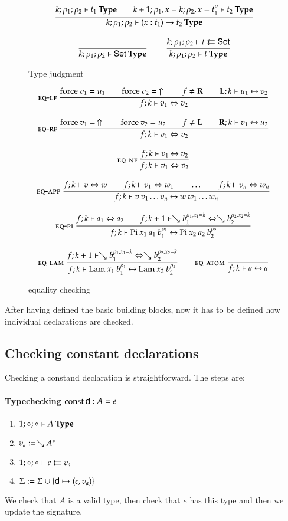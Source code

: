\begin{figure}[p]
\begin{gather*}
\nru{}
{\IsType{k}{\rho_1}{\rho_2}{t_1}
\qquad
\IsType{k+1}{\ins{\rho_1}{x}{k}}{\ins{\rho_2}{x}{\cl{t_1}{\rho}}}{t_2}}
{\IsType{k}{\rho_1}{\rho_2}{\EPi{x}{t_1}{t_2}}}
\\[2ex]
\nru{}{}{\IsType{k}{\rho_1}{\rho_2}{\Set}}
\qquad
\nru{}
{\Check{k}{\rho_1}{\rho_2}{t}{\Set}}
{\IsType{k}{\rho_1}{\rho_2}{t}}
\end{gather*}
\caption{Type judgment}
\end{figure}

\begin{figure}[p]
\begin{gather*}
\nru{\eqlf}
{\forc \: v_1 = u_1 \qquad \forc \: v_2 = \stuck 
\qquad
f \neq \rF \qquad \FeqVal{\lF}{k}{u_1}{v_2}}
{ \EqVal{f}{k}{v_1}{v_2}}
\\[2ex]
\nru{\eqrf}
{\forc \: v_1 = \stuck \qquad \forc \: v_2 = u_2 
\qquad
f \neq \lF \qquad \FeqVal{\rF}{k}{v_1}{u_2}}
{ \EqVal{f}{k}{v_1}{v_2}}
\\[2ex]
\nru{\eqnf}
{\FeqVal{f}{k}{v_1}{v_2}}
{ \EqVal{f}{k}{v_1}{v_2}}
\\[2ex]
\nru{\eqapp}
{\EqVal{f}{k}{v}{w} \qquad
\EqVal{f}{k}{v_1}{w_1} \qquad \ldots \qquad \EqVal{f}{k}{v_n}{w_n}}
{\FeqVal{f}{k}{v \: v_1 \ldots v_n}{w \: w_1 \ldots w_n}}
\\[2ex]
\nru{\eqpi}
{\EqVal{f}{k}{a_1}{a_2}
\qquad
\EqVal{f}{k+1}{\wh \cl{b_1}{\ins{\rho_1}{x_1}{k}}}{\wh \cl{b_2}{\ins{\rho_2}{x_2}{k}}}}
{\FeqVal{f}{k}{\vpi \: x_1 \: a_1 \: \cl{b_1}{\rho_1}}{\vpi \: x_2 \: a_2 \: \cl{b_2}{\rho_2}}}
\\[2ex]
\nru{\eqlam}
{\EqVal{f}{k+1}{\wh \cl{b_1}{\ins{\rho_1}{x_1}{k}}}{\wh \cl{b_2}{\ins{\rho_2}{x_2}{k}}}}
{\FeqVal{f}{k}{\vlam \: x_1 \: \cl{b_1}{\rho_1}}{\vlam \: x_2 \: \cl{b_2}{\rho_2}}}
\qquad
\nru{\eqatom}
{}
{\FeqVal{f}{k}{a}{a}}
\end{gather*}
\caption{equality checking}
\end{figure}

After having defined the basic building blocks, now it has to be defined how individual declarations are checked.
\subsection{Checking constant declarations}
Checking a constand declaration is straightforward.
The steps are:
\paragraph*{Typechecking $\const \dd : A = e $}
\begin{enumerate}
\item
$\IsType{1}{\diamond}{\diamond}{A}$
\item
$ v_a := \wh \cl{A}{\diamond}$
\item
$\Check{1}{\diamond}{\diamond}{e}{v_a}$
\item
$\Sig := \Sig \cup \{\dd \mapsto (e,v_a)\}$
\end{enumerate}
We check that $A$ is a valid type, then check that $e$ has this type and then we update the signature.
